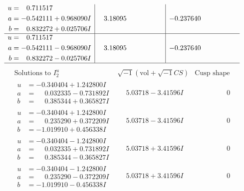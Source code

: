 \documentclass[1p]{elsarticle_modified}
\theoremstyle{definition}
\newcommand{\I}{\sqrt{-1}}
\begin{document}
$$\begin{array}{c|c|c}
\begin{aligned}
u &= \phantom{-}0.711517\phantom{ +0.000000I} \\
a &= -0.542111 + 0.968090 I \\
b &= \phantom{-}0.832272 + 0.025706 I\end{aligned}
 & \phantom{-}3.18095\phantom{ +0.000000I} & -0.237640\phantom{ +0.000000I} \\ \hline\begin{aligned}
u &= \phantom{-}0.711517\phantom{ +0.000000I} \\
a &= -0.542111 - 0.968090 I \\
b &= \phantom{-}0.832272 - 0.025706 I\end{aligned}
 & \phantom{-}3.18095\phantom{ +0.000000I} & -0.237640\phantom{ +0.000000I}\\
 \hline 
 \end{array}$$\newpage$$\begin{array}{c|c|c}  
\text{Solutions to }I^u_{2}& \I (\text{vol} + \sqrt{-1}CS) & \text{Cusp shape}\\
 \hline 
\begin{aligned}
u &= -0.340404 + 1.242800 I \\
a &= \phantom{-}0.032335 - 0.731892 I \\
b &= \phantom{-}0.385344 + 0.365827 I\end{aligned}
 & \phantom{-}5.03718 - 3.41596 I & \phantom{-0.000000 } 0 \\ \hline\begin{aligned}
u &= -0.340404 + 1.242800 I \\
a &= \phantom{-}0.235290 + 0.372209 I \\
b &= -1.019910 + 0.456338 I\end{aligned}
 & \phantom{-}5.03718 - 3.41596 I & \phantom{-0.000000 } 0 \\ \hline\begin{aligned}
u &= -0.340404 - 1.242800 I \\
a &= \phantom{-}0.032335 + 0.731892 I \\
b &= \phantom{-}0.385344 - 0.365827 I\end{aligned}
 & \phantom{-}5.03718 + 3.41596 I & \phantom{-0.000000 } 0 \\ \hline\begin{aligned}
u &= -0.340404 - 1.242800 I \\
a &= \phantom{-}0.235290 - 0.372209 I \\
b &= -1.019910 - 0.456338 I\end{aligned}
 & \phantom{-}5.03718 + 3.41596 I & \phantom{-0.000000 } 0 \\ \hline\begin{aligned}

\end{aligned}
\end{array}$$
\end{document}
